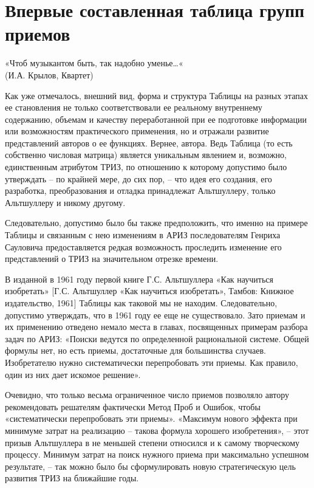 \documentclass[11pt,a4paper]{article}
\begin{document}
\section*{Впервые составленная таблица групп приемов}
\begin{flushright}
  «Чтоб музыкантом быть, так надобно уменье…«\\
  (И.А. Крылов, Квартет)
\end{flushright}
Как уже отмечалось, внешний вид, форма и структура Таблицы на разных этапах ее
становления не только соответствовали ее реальному внутреннему содержанию,
объемам и качеству переработанной при ее подготовке информации или
возможностям практического применения, но и отражали развитие представлений
авторов о ее функциях. Вернее, автора. Ведь Таблица (то есть собственно
числовая матрица) является уникальным явлением и, возможно, единственным
атрибутом ТРИЗ, по отношению к которому допустимо было утверждать -- по
крайней мере, до сих пор, -- что идея его создания, его разработка,
преобразования и отладка принадлежат Альтшуллеру, только Альтшуллеру и никому
другому.

Следовательно, допустимо было бы также предположить, что именно на примере
Таблицы и связанным с нею изменениям в АРИЗ последователям Генриха Сауловича
предоставляется редкая возможность проследить изменение его представлений о
ТРИЗ на значительном отрезке времени.

В изданной в 1961 году первой книге Г.С. Альтшуллера «Как научиться
изобретать» [Г.С. Альтшуллер «Как научиться изобретать», Тамбов: Книжное
  издательство, 1961] Таблицы как таковой мы не находим. Следовательно,
допустимо утверждать, что в 1961 году ее еще не существовало. Зато приемам и
их применению отведено немало места в главах, посвященных примерам разбора
задач по АРИЗ: «Поиски ведутся по определенной рациональной системе. Общей
формулы нет, но есть приемы, достаточные для большинства случаев. Изобретателю
нужно систематически перепробовать эти приемы. Как правило, один из них дает
искомое решение».

Очевидно, что только весьма ограниченное число приемов позволяло автору
рекомендовать решателям фактически Метод Проб и Ошибок, чтобы «систематически
перепробовать эти приемы». «Максимум нового эффекта при минимуме затрат на
реализацию -- такова формула хорошего изобретения», -- этот призыв Альтшуллера
в не меньшей степени относился и к самому творческому процессу. Минимум затрат
на поиск нужного приема при максимально успешном результате, -- так можно было
бы сформулировать новую стратегическую цель развития ТРИЗ на ближайшие годы.
\end{document}

